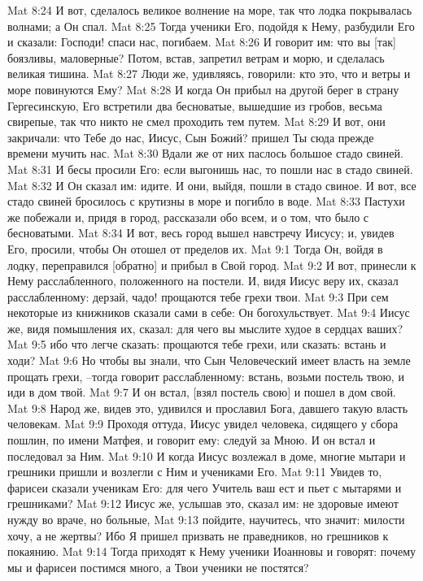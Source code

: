Mat 8:24  И вот, сделалось великое волнение на море, так что лодка покрывалась волнами; а Он спал.
Mat 8:25  Тогда ученики Его, подойдя к Нему, разбудили Его и сказали: Господи! спаси нас, погибаем.
Mat 8:26  И говорит им: что вы [так] боязливы, маловерные? Потом, встав, запретил ветрам и морю, и сделалась великая тишина.
Mat 8:27  Люди же, удивляясь, говорили: кто это, что и ветры и море повинуются Ему?
Mat 8:28  И когда Он прибыл на другой берег в страну Гергесинскую, Его встретили два бесноватые, вышедшие из гробов, весьма свирепые, так что никто не смел проходить тем путем.
Mat 8:29  И вот, они закричали: что Тебе до нас, Иисус, Сын Божий? пришел Ты сюда прежде времени мучить нас.
Mat 8:30  Вдали же от них паслось большое стадо свиней.
Mat 8:31  И бесы просили Его: если выгонишь нас, то пошли нас в стадо свиней.
Mat 8:32  И Он сказал им: идите. И они, выйдя, пошли в стадо свиное. И вот, все стадо свиней бросилось с крутизны в море и погибло в воде.
Mat 8:33  Пастухи же побежали и, придя в город, рассказали обо всем, и о том, что было с бесноватыми.
Mat 8:34  И вот, весь город вышел навстречу Иисусу; и, увидев Его, просили, чтобы Он отошел от пределов их.
Mat 9:1  Тогда Он, войдя в лодку, переправился [обратно] и прибыл в Свой город.
Mat 9:2  И вот, принесли к Нему расслабленного, положенного на постели. И, видя Иисус веру их, сказал расслабленному: дерзай, чадо! прощаются тебе грехи твои.
Mat 9:3  При сем некоторые из книжников сказали сами в себе: Он богохульствует.
Mat 9:4  Иисус же, видя помышления их, сказал: для чего вы мыслите худое в сердцах ваших?
Mat 9:5  ибо что легче сказать: прощаются тебе грехи, или сказать: встань и ходи?
Mat 9:6  Но чтобы вы знали, что Сын Человеческий имеет власть на земле прощать грехи, --тогда говорит расслабленному: встань, возьми постель твою, и иди в дом твой.
Mat 9:7  И он встал, [взял постель свою] и пошел в дом свой.
Mat 9:8  Народ же, видев это, удивился и прославил Бога, давшего такую власть человекам.
Mat 9:9  Проходя оттуда, Иисус увидел человека, сидящего у сбора пошлин, по имени Матфея, и говорит ему: следуй за Мною. И он встал и последовал за Ним.
Mat 9:10  И когда Иисус возлежал в доме, многие мытари и грешники пришли и возлегли с Ним и учениками Его.
Mat 9:11  Увидев то, фарисеи сказали ученикам Его: для чего Учитель ваш ест и пьет с мытарями и грешниками?
Mat 9:12  Иисус же, услышав это, сказал им: не здоровые имеют нужду во враче, но больные,
Mat 9:13  пойдите, научитесь, что значит: милости хочу, а не жертвы? Ибо Я пришел призвать не праведников, но грешников к покаянию.
Mat 9:14  Тогда приходят к Нему ученики Иоанновы и говорят: почему мы и фарисеи постимся много, а Твои ученики не постятся?
